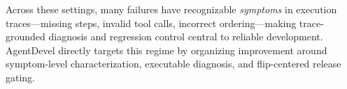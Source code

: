 \documentclass[11pt]{article}
\begin{document}
Across these settings, many failures have recognizable \textit{symptoms} in execution traces—missing steps, invalid tool calls, incorrect ordering—making trace-grounded diagnosis and regression control central to reliable development. AgentDevel directly targets this regime by organizing improvement around symptom-level characterization, executable diagnosis, and flip-centered release gating.



\end{document}
